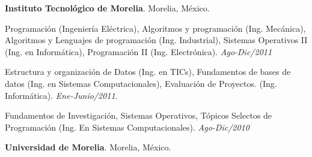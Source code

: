 \documentclass[10pt]{article}
\newenvironment{innerlist}[1][\enskip\textbullet]%
        {\begin{compactitem}[#1]}{\end{compactitem}}
\newcommand{\blankline}{\quad\pagebreak[2]}
\begin{document}
\blankline


\textbf{Instituto Tecnológico de Morelia}. Morelia, México.

\begin{innerlist}

\item Programación (Ingeniería Eléctrica), Algoritmos y programación (Ing. Mecánica), Algoritmos y Lenguajes de programación (Ing. Industrial), Sistemas Operativos II (Ing. en Informática), Programación II (Ing. Electrónica). \textit{Ago-Dic/2011} 
\item Estructura y organización de Datos (Ing. en TICs), Fundamentos de bases de datos (Ing. en Sistemas Computacionales), Evaluación de Proyectos. (Ing. Informática). \textit{Ene-Junio/2011}.
\item Fundamentos de Investigación, Sistemas Operativos, Tópicos Selectos de Programación (Ing. En Sistemas Computacionales).  \textit{Ago-Dic/2010} 

\end{innerlist}


\blankline

\blankline
\textbf{Universidad de Morelia}. Morelia, México.
\end{document}
